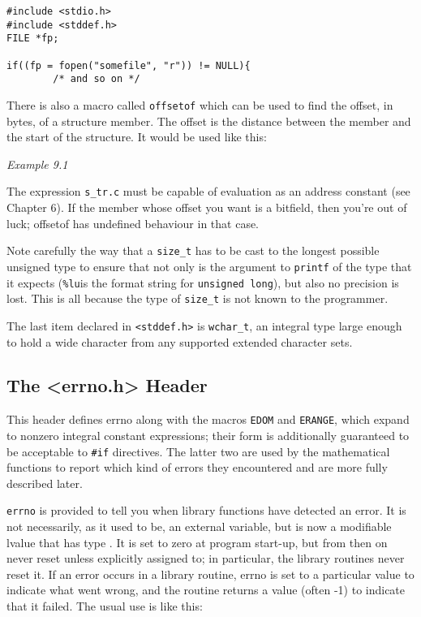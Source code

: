    \begin{Verbatim}
#include <stdio.h>
#include <stddef.h>
FILE *fp;

if((fp = fopen("somefile", "r")) != NULL){
        /* and so on */
\end{Verbatim}

   There is also a macro called \texttt{offsetof} which can be  used  to
    find  the  offset,  in  bytes,  of  a structure member.  The
    offset is the distance between the member and the  start  of
    the structure.  It would be used like this:


   \begin{center}\textit{Example 9.1}\end{center}


   The expression \texttt{s\_tr.c} must be capable of  evaluation  as  an
    address  constant  (see  Chapter 6).   If  the member whose
    offset you want is a bitfield,  then  you're  out  of  luck;
    offsetof has undefined behaviour in that case.


   Note carefully the way that a \texttt{size\_t} has to be cast  to  the
    longest  possible  unsigned  type to ensure that not only is the argument
    to \texttt{printf} of the type that it expects (\texttt{\%lu}is
    the  format string for \texttt{unsigned long}), but also no precision
    is lost.  This is all because the  type  of  \texttt{size\_t}  is  not
    known to the programmer.


   The last item declared in \texttt{<stddef.h>} is
    \texttt{wchar\_t}, an integral type large enough to hold a wide
    character from any supported extended character sets.


  

  \subsection{The <errno.h> Header}
   

   This header defines errno along with the macros \texttt{EDOM} and
    \texttt{ERANGE}, which expand to nonzero integral constant
    expressions; their form is additionally guaranteed to be
    acceptable to \texttt{\#if} directives.  The latter two are used by
    the mathematical functions to report which kind of errors
    they encountered and are more fully described later.


   \texttt{errno} is provided to tell you when library functions have
    detected an error.  It is not necessarily, as it used to be,
    an external variable, but is now a modifiable lvalue that
    has type \kint.  It is set to zero at program start-up, but
    from then on never reset unless explicitly assigned to; in
    particular, the library routines never reset it.  If an
    error occurs in a library routine, errno is set to a
    particular value to indicate what went wrong, and the
    routine returns a value (often -1) to indicate that it
    failed.  The usual use is like this:


